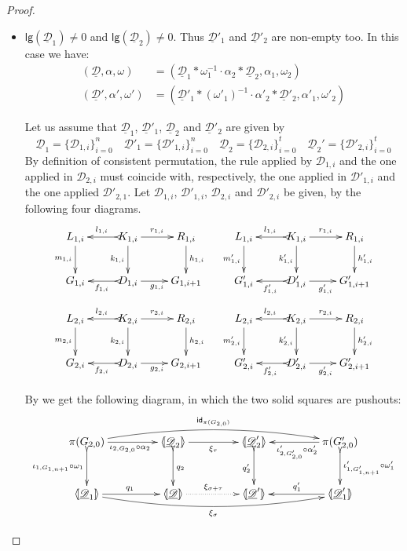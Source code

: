 \documentclass[a4paper]{article}
\newcommand{\id}[1]{\mathsf{id}_{#1}}
\newcommand{\dder}[1]{\mathscr{#1}}
\newcommand{\der}[1]{\underline{\dder{#1}}}
\newcommand{\lpro}{\langle \hspace{-1.85pt}[}
\newcommand{\rpro}{]\hspace{-1.85pt}\rangle}
\newcommand{\tpro}[1]{\lpro \der{#1}\rpro}
\newcommand{\lgh}[0]{\mathsf{lg}}
\theoremstyle{definition}
\begin{document}
\begin{proof}
\begin{itemize}
\item  $\lgh(\der{D}_1)\neq0$ and $\lgh(\der{D}_2)\neq 0$. Thus $\der{D}'_1$ and $\der{D}'_2$ are non-empty too. In this case we have:
\begin{align*}
	(\der{D}, \alpha, \omega)&=(\der{D}_1*\omega_1^{-1}\cdot \alpha_2*\der{D}_2, \alpha_1, \omega_2)\\
	(\der{D}', \alpha', \omega')&=(\der{D}'_1*(\omega'_1)^{-1}\cdot \alpha'_2*\der{D}'_2, \alpha'_1, \omega'_2)
\end{align*}

Let us assume that $\der{D}_1$, $\der{D}'_1$, $\der{D}_2$ and $\der{D}'_2$ are given by
\[\der{D}_1=\{\dder{D}_{1,i}\}_{i=0}^n \quad \der{D}'_1=\{\dder{D}'_{1,i}\}_{i=0}^n \quad \der{D}_2=\{\dder{D}_{2,i}\}_{i=0}^t \quad \der{D}_2'=\{\dder{D}'_{2,i}\}_{i=0}^t\]
By definition of consistent permutation, the rule applied by $\dder{D}_{1,i}$ and the one applied in $\dder{D}_{2,i}$  must coincide with, respectively, the one applied in $\dder{D}'_{1,i}$ and the one applied $\dder{D}'_{2,1}$. Let $\dder{D}_{1,i}$, $\dder{D}'_{1,i}$, $\dder{D}_{2,i}$ and $\dder{D}'_{2,i}$ be given, by the following four diagrams. 
\[\xymatrix{L_{1,i} \ar[d]_{m_{1, i}}& K_{1,i} \ar[d]_{k_{1, i}} \ar[r]^{r_{1,i}} \ar@{>->}[l]_{l_{1,i}} & R_{1,i}\ar[d]^{h_{1, i}} &L_{1,i} \ar[d]_{m'_{1, i}}& K_{1,i} \ar[d]_{k'_{1, i}} \ar[r]^{r_{1,i}} \ar@{>->}[l]_{l_{1,i}} & R_{1,i}\ar[d]^{h'_{1, i}} \\G_{1,i} & D_{1,i} \ar[r]_{g_{1,i}} \ar@{>->}[l]^{f_{1,i}} & G_{1,i+1} & G'_{1,i} & D'_{1,i}\ar[r]_{g'_{1,i}} \ar@{>->}[l]^{f'_{1,i}}  & G'_{1,i+1}}\]		
\[\xymatrix{L_{2,i} \ar[d]_{m_{2, i}}& K_{2,i} \ar[d]_{k_{2, i}} \ar[r]^{r_{2,i}} \ar@{>->}[l]_{l_{2,i}} & R_{2,i}\ar[d]^{h_{2, i}} &L_{2,i} \ar[d]_{m'_{2, i}}& K_{2,i} \ar[d]_{k'_{2, i}} \ar[r]^{r_{2,i}} \ar@{>->}[l]_{l_{2,i}} & R_{2,i}\ar[d]^{h'_{2, i}} \\G_{2,i} & D_{2,i} \ar[r]_{g_{2,i}} \ar@{>->}[l]^{f_{2,i}} & G_{2,i+1} & G'_{2,i} & D'_{2,i}\ar[r]_{g'_{2,i}} \ar@{>->}[l]^{f'_{2,i}}  & G'_{2,i+1}}\] 

By  we get the following diagram, in which the two solid squares are pushouts:
\[\xymatrix@C=45pt@R=30pt{\pi(G_{2,0}) \ar@/^.4cm/[rrr]^{\id{\pi(G_{2,0})}}\ar@{>->}[d]_{\iota_{1, G_{1,n+1}} \circ \omega_1}\ar[r]_{\iota_{2, G_{2,0}} \circ \alpha_2}& \lpro \der{D}_2 \rpro \ar@{>->}[d]^{q_2}\ar[r]_{\xi_\tau} & \lpro \der{D}'_2 \rpro \ar@{>->}[d]_{q'_2} &\pi(G'_{2,0}) \ar@{>->}[d]^{\iota'_{1, G'_{1,n+1}} \circ \omega'_1} \ar[l]^{\iota'_{2, G'_{2,0}} \circ \alpha'_2}\\ \lpro \der{D}_1 \rpro \ar@/_.4cm/[rrr]_{\xi_\sigma} \ar[r]^{q_1} & \tpro{D} \ar@{.>}[r]^{\xi_{\sigma+\tau}} & \lpro \der{D}'\rpro & \lpro \der{D}'_1\rpro  \ar[l]_{q'_1}}\]


\end{itemize}
\end{proof}
\end{document}

